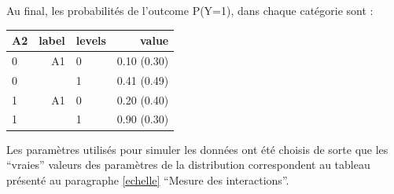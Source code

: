 \documentclass[
]{book}
\newenvironment{Shaded}{\begin{snugshade}}{\end{snugshade}}
\newcommand{\AttributeTok}[1]{\textcolor[rgb]{0.77,0.63,0.00}{#1}}
\newcommand{\CommentTok}[1]{\textcolor[rgb]{0.56,0.35,0.01}{\textit{#1}}}
\newcommand{\DecValTok}[1]{\textcolor[rgb]{0.00,0.00,0.81}{#1}}
\newcommand{\DocumentationTok}[1]{\textcolor[rgb]{0.56,0.35,0.01}{\textbf{\textit{#1}}}}
\newcommand{\FunctionTok}[1]{\textcolor[rgb]{0.00,0.00,0.00}{#1}}
\newcommand{\NormalTok}[1]{#1}
\newcommand{\OtherTok}[1]{\textcolor[rgb]{0.56,0.35,0.01}{#1}}
\newcommand{\SpecialCharTok}[1]{\textcolor[rgb]{0.00,0.00,0.00}{#1}}
\newcommand{\StringTok}[1]{\textcolor[rgb]{0.31,0.60,0.02}{#1}}
\begin{document}
\begin{Shaded}
\end{Shaded}

Au final, les probabilités de l'outcome P(Y=1), dans chaque catégorie sont :

\begin{table}[!h]
\centering\begingroup\fontsize{9}{11}\selectfont

\begin{tabular}{lrlr}
\toprule
A2 & label & levels & value\\
\midrule
0 & A1 & 0 & 0.10 (0.30)\\
0 &  & 1 & 0.41 (0.49)\\
1 & A1 & 0 & 0.20 (0.40)\\
1 &  & 1 & 0.90 (0.30)\\
\bottomrule
\end{tabular}
\endgroup{}
\end{table}

Les paramètres utilisés pour simuler les données ont été choisis de sorte que les ``vraies'' valeurs des paramètres de la distribution correspondent au tableau présenté au paragraphe \ref{echelle} ``Mesure des interactions''.
\end{document}
